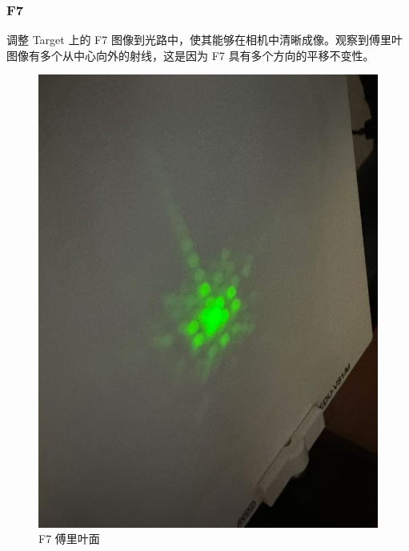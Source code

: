 \documentclass{ctexart}
\begin{document}
\subsubsection{F7}
调整 Target 上的 F7 图像到光路中，使其能够在相机中清晰成像。观察到傅里叶图像有多个从中心向外的射线，这是因为 F7 具有多个方向的平移不变性。
\begin{figure}[H]
  \centering
  \begin{minipage}[b]{0.2\textwidth}
    \centering
    \includegraphics[width=\textwidth]{pictures/微信图片_20241017164811.jpg}
    \caption{F7 傅里叶面}
  \end{minipage}
  \hspace{0.1\textwidth} %
  \begin{minipage}[b]{0.3\textwidth}
    \centering

\end{minipage}
\end{figure}
\end{document}
